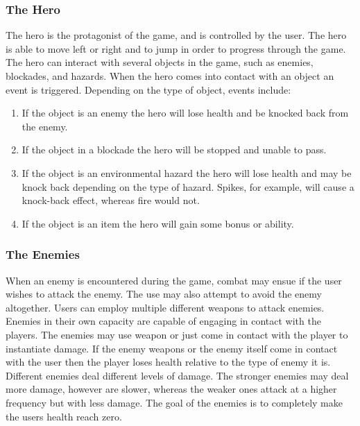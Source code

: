 \documentclass[12pt, titlepage]{article}
\begin{document}
\subsubsection{The Hero}
The hero is the protagonist of the game, and is controlled by the user.  The hero is able to move left or right and to jump in order to progress through the game.  The hero can interact with several objects in the game, such as enemies, blockades, and hazards.  When the hero comes into contact with an object an event is triggered.  Depending on the type of object, events include:

\begin{enumerate}
  \item If the object is an enemy the hero will lose health and be knocked back from the enemy.
  \item If the object in a blockade the hero will be stopped and unable to pass.
  \item If the object is an environmental hazard the hero will lose health and may be knock back depending on the type of hazard.  Spikes, for example, will cause a knock-back effect, whereas fire would not.
  \item If the object is an item the hero will gain some bonus or ability.  
\end{enumerate}




\subsubsection{The Enemies}
	When an enemy is encountered during the game, combat may ensue if the user wishes to attack the enemy.  The use may also attempt to avoid the enemy altogether. Users can employ multiple different weapons to attack enemies. Enemies in their own capacity are capable of engaging in contact with the players. The enemies may use weapon or just come in contact with the player to instantiate damage. If the enemy weapons or the enemy itself come in contact with the user then the player loses health relative to the type of enemy it is. Different enemies deal different levels of damage. The stronger enemies may deal more damage, however are slower, whereas the weaker ones attack at a higher frequency but with less damage. The goal of the enemies is to completely make the users health reach zero.
\end{document}
